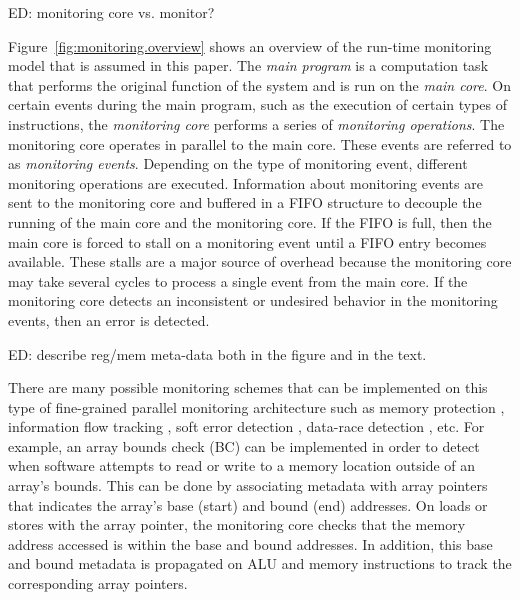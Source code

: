 ED: monitoring core vs. monitor? 

Figure~\ref{fig:monitoring.overview} shows an overview of the run-time monitoring
model that is assumed in this paper.  The \emph{main program} is a computation
task that performs the original function of the system and is run on the
\emph{main core}.  On certain events during the main program, such as the
execution of certain types of instructions, the \emph{monitoring core} performs a
series of \emph{monitoring operations}. The monitoring core operates in parallel to the
main core. These events are referred to as \emph{monitoring events}. Depending
on the type of monitoring event, different monitoring operations are
executed. Information about monitoring events are sent to the monitoring core and buffered in a FIFO structure to decouple the
running of the main core and the monitoring core. If the FIFO is full, then the main
core is forced to stall on a monitoring event until a FIFO entry becomes
available. These stalls are a major source of
overhead because the monitoring core may take several cycles to process a single event
from the main core. 
If the monitoring core
detects an inconsistent or undesired behavior in the monitoring events, then
an error is detected. 

ED: describe reg/mem meta-data both in the figure and in the text.

There are many possible monitoring schemes that can be implemented on this type
of fine-grained parallel monitoring architecture such as memory protection
\cite{mondrian-asplos02}, information flow tracking \cite{dift-asplos04,
testudo-micro08}, soft error detection \cite{argus-micro07}, data-race
detection \cite{cord-hpca06}, etc.  For example, an array bounds check (BC)
\cite{hardbound-asplos08} can be implemented in order to detect
when software attempts to read or write to a memory location outside of an
array's bounds. This can be done by associating metadata with array pointers that 
indicates the array's base (start) and bound (end) addresses. On loads or stores with the
array
pointer, the monitoring core checks that the memory address accessed is within the base and
bound addresses. In addition, this base and bound metadata
is propagated on ALU and memory instructions to track the corresponding array pointers.

